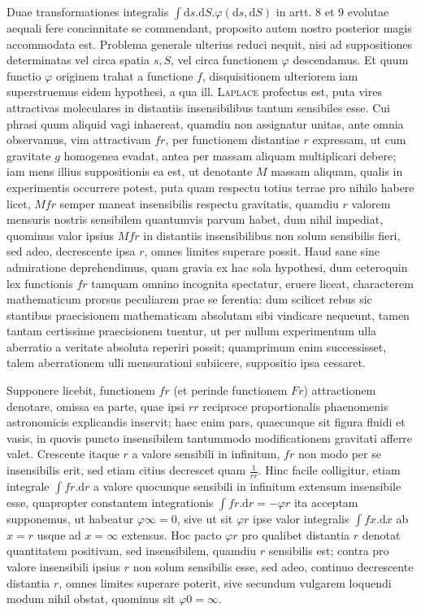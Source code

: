 Duae transformationes integralis $\int\mathrm{d}s.\mathrm{d}S.\varphi(\mathrm{d}s,\mathrm{d}S)$ in artt. 8 et 9 evolutae aequali fere concinnitate se commendant, proposito autem nostro posterior magis accommodata est. Problema generale ulterius reduci nequit, nisi ad suppositiones determinatas vel circa spatia $s,S$, vel circa functionem $\varphi$ descendamus. Et quum functio $\varphi$ originem trahat a functione $f$, disquisitionem ulteriorem iam superstruemus eidem hypothesi, a qua ill. \textsc{Laplace} profectus est, puta vires attractivas moleculares in distantiis insensibilibus tantum sensibiles esse. Cui phrasi quum aliquid vagi inhaereat, quamdiu non assignatur unitas, ante omnia observamus, vim attractivam $fr$, per functionem distantiae $r$ expressam, ut cum gravitate $g$ homogenea evadat, antea per massam aliquam multiplicari debere; iam mens illius suppositionis ea est, ut denotante $M$ massam aliquam, qualis in experimentis occurrere potest, puta quam respectu totius terrae pro nihilo habere licet, $Mfr$ semper maneat insensibilis respectu gravitatis, quamdiu $r$ valorem mensuris nostris sensibilem quantumvis parvum habet, dum nihil impediat, quominus valor ipsius $Mfr$ in distantiis insensibilibus non solum sensibilis fieri, sed adeo, decrescente ipsa $r$, omnes limites superare possit. Haud sane sine admiratione deprehendimus, quam gravia ex hac sola hypothesi, dum ceteroquin lex functionis $fr$ tamquam omnino incognita spectatur, eruere liceat, characterem mathematicum prorsus peculiarem prae se ferentia: dum scilicet rebus sic stantibus praecisionem mathematicam absolutam sibi vindicare nequeunt, tamen tantam certissime praecisionem tuentur, ut per nullum experimentum ulla aberratio a veritate absoluta reperiri possit; quamprimum enim successisset, talem aberrationem ulli mensurationi subiicere, suppositio ipsa cessaret.

Supponere licebit, functionem $fr$ (et perinde functionem $Fr$) attractionem denotare, omissa ea parte, quae ipsi $rr$ reciproce proportionalis phaenomenis astronomicis explicandis inservit; haec enim pars, quaecunque sit figura fluidi et vasis, in quovis puncto insensibilem tantummodo modificationem gravitati afferre valet. Crescente itaque $r$ a valore sensibili in infinitum, $fr$ non modo per se insensibilis erit, sed etiam citius decrescet quam $\frac{1}{rr}$. Hinc facile colligitur, etiam integrale $\int fr.\mathrm{d}r$ a valore quocunque sensibili in infinitum extensum insensibile esse, quapropter constantem integrationis $\int fr.\mathrm{d}r=-\varphi r$ ita acceptam supponemus, ut habeatur $\varphi\infty=0$, sive ut sit $\varphi r$ ipse valor integralis $\int fx.\mathrm{d}x$ ab $x=r$ usque ad $x=\infty$ extensus. Hoc pacto $\varphi r$ pro qualibet distantia $r$ denotat quantitatem positivam, sed insensibilem, quamdiu $r$ sensibilis est; contra pro valore insensibili ipsius $r$ non solum sensibilis esse, sed adeo, continuo decrescente distantia $r$, omnes limites superare poterit, sive secundum vulgarem loquendi modum nihil obstat, quominus sit $\varphi0=\infty$.

